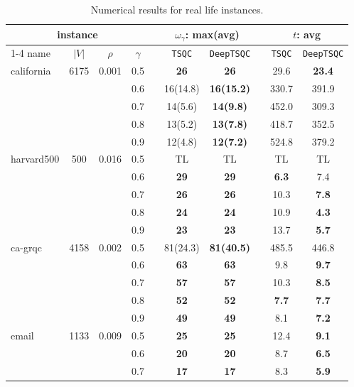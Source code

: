 \begin{table}[h!]
    \footnotesize
    \caption{Numerical results for real life instances.}
    \label{tab: real life}
    \centering
    \begin{tabular}{l c c c c c c c c c}
    \toprule
    \toprule
    \multicolumn{4}{c}{instance} & & \multicolumn{2}{c}{$\omega_{\gamma}$: max(avg)} & &
    \multicolumn{2}{c}{$t$: avg} \\
    \cmidrule{1-4} \cmidrule{6-7} \cmidrule{9-10}
    name & $|V|$ & $\rho$ & $\gamma$ & & \texttt{TSQC} & \texttt{DeepTSQC} & & \texttt{TSQC} & \texttt{DeepTSQC} \\
    \midrule
california & 6175 & 0.001 & 0.5 & & \textbf{26} & \textbf{26} & & 29.6 & \textbf{23.4} \\
& & & 0.6 & & 16(14.8) & \textbf{16(15.2)} & & 330.7 & 391.9 \\
& & & 0.7 & & 14(5.6) & \textbf{14(9.8)} & & 452.0 & 309.3 \\
& & & 0.8 & & 13(5.2) & \textbf{13(7.8)} & & 418.7 & 352.5 \\
& & & 0.9 & & 12(4.8) & \textbf{12(7.2)} & & 524.8 & 379.2 \\
\midrule
harvard500 & 500 & 0.016 & 0.5 & & TL & TL & & TL & TL \\
& & & 0.6 & & \textbf{29} & \textbf{29} & & \textbf{6.3} & 7.4 \\
& & & 0.7 & & \textbf{26} & \textbf{26} & & 10.3 & \textbf{7.8} \\
& & & 0.8 & & \textbf{24} & \textbf{24} & & 10.9 & \textbf{4.3} \\
& & & 0.9 & & \textbf{23} & \textbf{23} & & 13.7 & \textbf{5.7} \\
\midrule
ca-grqc & 4158 & 0.002 & 0.5 & & 81(24.3) & \textbf{81(40.5)} & & 485.5 & 446.8 \\
& & & 0.6 & & \textbf{63} & \textbf{63} & & 9.8 & \textbf{9.7} \\
& & & 0.7 & & \textbf{57} & \textbf{57} & & 10.3 & \textbf{8.5} \\
& & & 0.8 & & \textbf{52} & \textbf{52} & & \textbf{7.7} & \textbf{7.7} \\
& & & 0.9 & & \textbf{49} & \textbf{49} & & 8.1 & \textbf{7.2} \\
\midrule
email & 1133 & 0.009 & 0.5 & & \textbf{25} & \textbf{25} & & 12.4 & \textbf{9.1} \\
& & & 0.6 & & \textbf{20} & \textbf{20} & & 8.7 & \textbf{6.5} \\
& & & 0.7 & & \textbf{17} & \textbf{17} & & 8.3 & \textbf{5.9} \\

\end{tabular}
\end{table}
